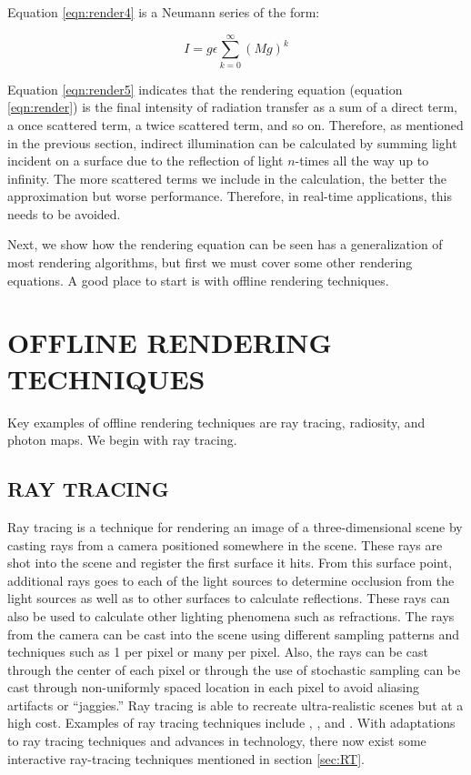 Equation \ref{eqn:render4} is a Neumann series of the form:

\begin{equation}
I = g\epsilon\sum_{k=0}^{\infty}(Mg)^k \label{eqn:render5}
\end{equation}

Equation \ref{eqn:render5} indicates that the rendering equation (equation \ref{eqn:render}) is the final intensity of radiation transfer as a sum of a direct term, a once scattered term, a twice scattered term, and so on.  Therefore, as mentioned in the previous section, indirect illumination can be calculated by summing light incident on a surface due to the reflection of light $n$-times all the way up to infinity.  The more scattered terms we include in the calculation, the better the approximation but worse performance.  Therefore, in real-time applications, this needs to be avoided.  

Next, we show how the rendering equation can be seen has a generalization of most rendering algorithms, but first we must cover some other rendering equations.  A good place to start is with offline rendering techniques.

\section{OFFLINE RENDERING TECHNIQUES}
Key examples of offline rendering techniques are ray tracing, radiosity, and photon maps.  We begin with ray tracing.

\subsection{RAY TRACING}

Ray tracing is a technique for rendering an image of a three-dimensional scene by casting rays from a camera positioned somewhere in the scene.  These rays are shot into the scene and register the first surface it hits.  From this surface point, additional rays goes to each of the light sources to determine occlusion from the light sources as well as to other surfaces to calculate reflections.  These rays can also be used to calculate other lighting phenomena such as refractions.  The rays from the camera can be cast into the scene using different sampling patterns and techniques such as 1 per pixel or many per pixel.  Also, the rays can be cast through the center of each pixel or through the use of stochastic sampling can be cast through non-uniformly spaced location in each pixel to avoid aliasing artifacts or “jaggies.” Ray tracing is able to recreate ultra-realistic scenes but at a high cost.  Examples of ray tracing techniques include \cite{Whitted1980}, \cite{Cook1986}, and \cite{Ward1988}.  With adaptations to ray tracing techniques and advances in technology, there now exist some interactive ray-tracing techniques mentioned in section \ref{sec:RT}.

